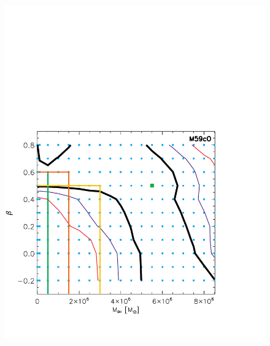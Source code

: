 \documentclass{aastex}
\begin{document}
\begin{figure}[ht!]
\begin{minipage}{0.45\textwidth}
    \includegraphics[trim={0.11cm 0 0 10cm},clip,scale=0.44]{m59co_betambh.pdf}%
  \end{minipage}
  \begin{minipage}{0.45\textwidth}

\end{minipage}
\end{figure}
\end{document}
